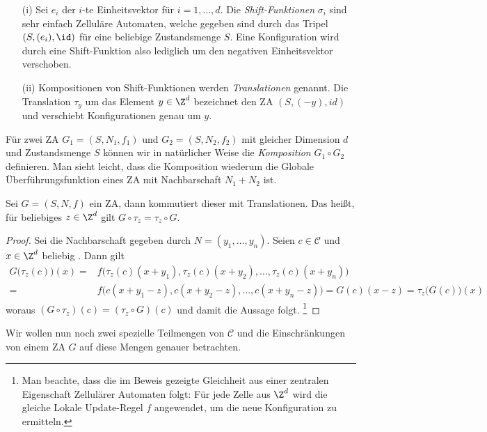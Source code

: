 \begin{example}
  \begin{itemize}
    \item[(i)] Sei $e_i$ der $i$-te Einheitsvektor für $i = 1,\dots,d$. Die \textit{Shift-Funktionen} $\sigma_i$ sind sehr einfach Zelluläre Automaten, welche gegeben sind durch das Tripel $(S,(e_i), \id)$ für eine beliebige Zustandsmenge $S$. Eine Konfiguration wird durch eine Shift-Funktion also lediglich um den negativen Einheitsvektor verschoben.
    \item[(ii)] Kompositionen von Shift-Funktionen werden \textit{Translationen} genannt. Die Translation $\tau_y$ um das Element $y \in \Z^d$ bezeichnet den ZA $(S, (-y), id)$ und verschiebt Konfigurationen genau um $y$.
  \end{itemize}
\end{example}

Für zwei ZA $G_1 = (S,N_1,f_1)$ und $G_2 = (S,N_2,f_2)$ mit gleicher Dimension $d$ und Zustandsmenge $S$ können wir in natürlicher Weise die \textit{Komposition} $G_1 \circ G_2$ definieren. Man sieht leicht, dass die Komposition wiederum die Globale Überführungsfunktion eines ZA mit Nachbarschaft $N_1+N_2$ ist.

\begin{theorem}\label{commute}
  Sei $G = (S,N,f)$ ein ZA, dann kommutiert dieser mit Translationen. Das heißt, für beliebiges $z \in \Z^d$ gilt $G \circ \tau_z = \tau_z \circ G$.
\end{theorem}

\begin{proof}
  Sei die Nachbarschaft gegeben durch $N = (y_1, \dots, y_n)$. Seien $c \in \mathcal{C}$ und $x \in \Z^d$ beliebig . Dann gilt
  \begin{align*}
    G\big(\tau_z(c)\big)(x) =& f \big(\tau_z(c)(x+y_1), \tau_z(c)(x+y_2), \dots, \tau_z(c)(x+y_n)\big)\\
     =& f \big(c(x+y_1-z), c(x+y_2-z), \dots, c(x+y_n-z)\big) = G(c)(x-z) = \tau_z\big(G(c)\big)(x)
  \end{align*}
  woraus $(G \circ \tau_z)(c) = (\tau_z \circ G)(c)$ und damit die Aussage folgt. \footnote{Man beachte, dass die im Beweis gezeigte Gleichheit aus einer zentralen Eigenschaft Zellulärer Automaten folgt: Für jede Zelle aus $\Z^d$ wird die gleiche Lokale Update-Regel $f$ angewendet, um die neue Konfiguration zu ermitteln.}
\end{proof}

Wir wollen nun noch zwei spezielle Teilmengen von $\mathcal{C}$ und die Einschränkungen von einem ZA $G$ auf diese Mengen genauer betrachten.

